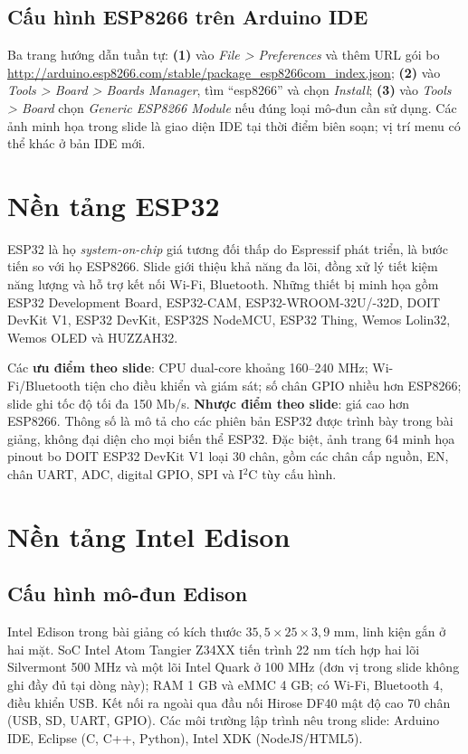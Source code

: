 \subsection{Cấu hình ESP8266 trên Arduino IDE}
Ba trang hướng dẫn tuần tự: \textbf{(1)} vào \emph{File > Preferences} và thêm URL gói bo \url{http://arduino.esp8266.com/stable/package_esp8266com_index.json}; \textbf{(2)} vào \emph{Tools > Board > Boards Manager}, tìm ``esp8266'' và chọn \emph{Install}; \textbf{(3)} vào \emph{Tools > Board} chọn \emph{Generic ESP8266 Module} nếu đúng loại mô-đun cần sử dụng. Các ảnh minh họa trong slide là giao diện IDE tại thời điểm biên soạn; vị trí menu có thể khác ở bản IDE mới.
\section{Nền tảng ESP32}
ESP32 là họ \emph{system-on-chip} giá tương đối thấp do Espressif phát triển, là bước tiến so với họ ESP8266. Slide giới thiệu khả năng đa lõi, đồng xử lý tiết kiệm năng lượng và hỗ trợ kết nối Wi-Fi, Bluetooth. Những thiết bị minh họa gồm ESP32 Development Board, ESP32-CAM, ESP32-WROOM-32U/-32D, DOIT DevKit V1, ESP32 DevKit, ESP32S NodeMCU, ESP32 Thing, Wemos Lolin32, Wemos OLED và HUZZAH32.

Các \textbf{ưu điểm theo slide}: CPU dual-core khoảng 160--240 MHz; Wi-Fi/Bluetooth tiện cho điều khiển và giám sát; số chân GPIO nhiều hơn ESP8266; slide ghi tốc độ tối đa 150 Mb/s. \textbf{Nhược điểm theo slide}: giá cao hơn ESP8266. Thông số là mô tả cho các phiên bản ESP32 được trình bày trong bài giảng, không đại diện cho mọi biến thể ESP32. Đặc biệt, ảnh trang 64 minh họa pinout bo DOIT ESP32 DevKit V1 loại 30 chân, gồm các chân cấp nguồn, EN, chân UART, ADC, digital GPIO, SPI và I\(^{2}\)C tùy cấu hình.
\section{Nền tảng Intel Edison}
\subsection{Cấu hình mô-đun Edison}
Intel Edison trong bài giảng có kích thước $35{,}5\times25\times3{,}9$ mm, linh kiện gắn ở hai mặt. SoC Intel Atom Tangier Z34XX tiến trình 22 nm tích hợp hai lõi Silvermont 500 MHz và một lõi Intel Quark ở 100 MHz (đơn vị trong slide không ghi đầy đủ tại dòng này); RAM 1 GB và eMMC 4 GB; có Wi-Fi, Bluetooth 4, điều khiển USB. Kết nối ra ngoài qua đầu nối Hirose DF40 mật độ cao 70 chân (USB, SD, UART, GPIO). Các môi trường lập trình nêu trong slide: Arduino IDE, Eclipse (C, C++, Python), Intel XDK (NodeJS/HTML5).
